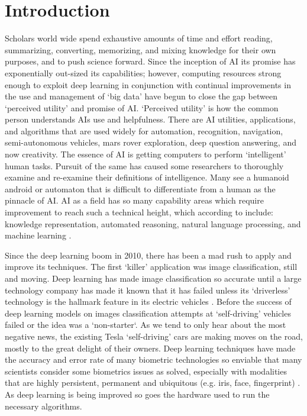 \section{Introduction}


\noindent Scholars world wide spend exhaustive amounts of time and effort reading, summarizing, converting, memorizing, and mixing knowledge for their own purposes, and to push science forward.
Since the inception of AI its promise has exponentially out-sized its capabilities; however, computing resources strong enough to exploit deep learning in conjunction with continual improvements in the use and management of `big data' have begun to close the gap between `perceived utility' and promise of AI.
`Perceived utility' is how the common person understands AIs use and helpfulness.
There are AI utilities, applications, and algorithms that are used widely for automation, recognition, navigation, semi-autonomous vehicles, mars rover exploration, deep question answering, and now creativity.
The essence of AI is getting computers to perform `intelligent' human tasks.
Pursuit of the same has caused some researchers to thoroughly examine and re-examine their definitions of intelligence.
Many see a humanoid android or automaton that is difficult to differentiate from a human as the pinnacle of AI. 
AI as a field has so many capability areas which require improvement to reach such a technical height, which according to \cite{RussellNorvig:2016} include: knowledge representation, automated reasoning, natural language processing, and machine learning  
\cite{Azaria:2022,DePeau-Wilson:2023,Foucart:2023,Zhang:2023}.


Since the deep learning boom in 2010, there has been a mad rush to apply and improve its techniques.
The first `killer' application was image classification, still and moving.
Deep learning has made image classification so accurate until a large technology company has made it known that it has failed unless its `driverless' technology is the hallmark feature in its electric vehicles . 
Before the success of deep learning models on images classification attempts at `self-driving' vehicles failed or the idea was a `non-starter`.
As we tend to only hear about the most negative news, the existing Tesla `self-driving' cars are making moves on the road, mostly to the great delight of their owners.
Deep learning techniques have made the accuracy and error rate of many biometric technologies so enviable that many scientists consider some biometrics issues as solved, especially with modalities that are highly persistent, permanent and ubiquitous (e.g. iris, face, fingerprint) .
As deep learning is being improved so goes the hardware used to run the necessary algorithms.

